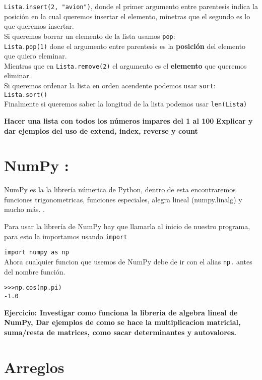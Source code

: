 \documentclass[12pt]{article}
\begin{document}
\verb+Lista.insert(2, "avion")+, donde el primer argumento entre parentesis indica la posici\'on 
en la cual queremos insertar el elemento, minetras que el segundo es lo que queremos insertar.\\

Si queremos borrar un elemento de la lista usamos \verb+pop+:\\

\verb+Lista.pop(1)+ done el argumento entre parentesis es la {\bf posici\'on} del elemento que quiero eleminar.\\

Mientras que en \verb+Lista.remove(2)+ el argumento es el {\bf elemento} que queremos eliminar. \\

Si queremos ordenar la lista en orden acendente podemos usar \verb+sort+: \\

\verb+Lista.sort()+ \\

Finalmente si queremos saber la longitud de la lista podemos usar \verb+len(Lista)+

{\bf Hacer una lista con todos los n\'umeros impares del 1 al 100} 
{\bf Explicar y dar ejemplos del uso de extend, index, reverse y count}

\section{NumPy :}
NumPy es la la librer\'ia n\'umerica de Python, dentro de esta encontraremos funciones 
trigonometricas, funciones especiales, alegra lineal (numpy.linalg) y mucho m\'as. 
.

Para usar la librer\'ia de NumPy hay que llamarla al inicio de nuestro programa, para esto la importamos 
usando \verb+import+

\verb+import numpy as np+ \\

Ahora cualquier funcion que usemos de NumPy debe de ir con el alias \verb+np.+ antes del nombre funci\'on.

\verb+>>>np.cos(np.pi)+ \\
\verb+-1.0+

{\bf Ejercicio: Investigar como funciona la libreria de algebra lineal de NumPy, Dar ejemplos de como se hace 
la multiplicacion matricial, suma/resta de matrices, como sacar determinantes y autovalores.}

\section{Arreglos}
\end{document}

